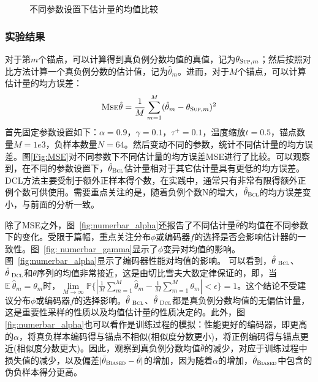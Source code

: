 \begin{figure}[h!]
	\centering
	\hspace{0.1cm}
	\caption{不同参数设置下估计量的均值比较}
	\label{fig:numer_bar}
\end{figure}

\subsubsection{实验结果}
对于第$m$个锚点，可以计算得到真负例分数均值的真值，记为$\theta_{\textsc{Sup}, m}$；然后按照对比方法计算一个真负例分数的估计值，记为$\hat{\theta}_{m}$。进而，对于$M$个锚点，可以计算估计量的均方误差：
\[\textsc{Mse}\hat{\theta} = \frac{1}{M}\sum_{m=1}^M (\hat{\theta}_{m} -\theta_{\textsc{Sup}, m})^2 \]
首先固定参数设置如下：$\alpha=0.9$，$\gamma=0.1$，$\tau^+=0.1$，温度缩放$t=0.5$，锚点数量$M=1e3$，负样本数量$N=64$。然后变动不同的参数，统计不同估计量的均方误差。图\ref{Fig:MSE}对不同参数下不同估计量的均方误差MSE进行了比较。可以观察到，在不同的参数设置下，$\hat{\theta}_{\textsc{Bcl}}$估计量相对于其它估计量具有更低的均方误差。DCL方法主要受制于额外正样本得个数，在实践中，通常只有非常有限得额外正例个数可供使用。需要重点关注的是，随着负例个数N的增大，$\hat{\theta}_{\textsc{Bcl}}$的均方误差变小，与前面的分析一致。

除了MSE之外，图~\ref{fig:numerbar_alpha}还报告了不同估计量$\hat\theta$的均值在不同参数下的变化。受限于篇幅，重点关注分布$\phi$或编码器$f$的选择是否会影响估计器的一致性。图~\ref{fig: numerbar_gamma}显示了$\phi$变异对均值的影响。图~\ref{fig:numerbar_alpha}显示了编码器性能对均值的影响。
可以看到，$\hat\theta_\textsc{~Bcl}$、$\hat\theta_\textsc{~Dcl}$和$\theta$序列的均值非常接近，这是由切比雪夫大数定律保证的，即，当$\mathbb E ~\hat\theta_m = \theta_m$时，$\lim\limits_{M\rightarrow\infty} \mathbb{P}\{|\frac{1}{M}\sum_{m=1}^{M} \hat{\theta}_m-\frac{1}{M}\sum_{m=1}^{M} \theta_m |< \epsilon \} =1
$。这个结论不受建议分布$\phi$或编码器$f$的选择影响。$\hat\theta_\textsc{~Bcl}$、$\hat\theta_\textsc{~Dcl}$都是真负例分数均值的无偏估计量，这是重要性采样的性质以及均值估计量的性质决定的。此外，图\ref{fig:numerbar_alpha}也可以看作是训练过程的模拟：性能更好的编码器，即更高的$\alpha$，将真负样本编码得与锚点不相似(相似度分数更小)，将正例编码得与锚点更近(相似度分数更大)。因此，观察到真负例分数均值$\bar\theta$的减少，对应于训练过程中损失值的减少，以及偏差$|\bar\theta_\textsc{Biased} -\bar\theta|$的增加，因为随着$\alpha$的增加，$\bar\theta_\textsc{Biased}$中包含的伪负样本得分更高。



